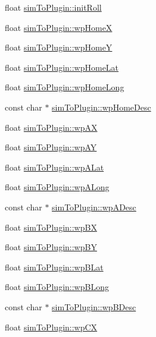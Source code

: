 \begin{DoxyCompactItemize}
\item 
float \hyperlink{group___aero_sim_r_c_ga26c1191f08e580c1cdbd02791eabe60e}{sim\-To\-Plugin\-::init\-Roll}
\item 
float \hyperlink{group___aero_sim_r_c_gac7fe47d860d72f33b075d84a1794f039}{sim\-To\-Plugin\-::wp\-Home\-X}
\item 
float \hyperlink{group___aero_sim_r_c_ga943c9583ab5e36a5c4b4eb92b34c3aa2}{sim\-To\-Plugin\-::wp\-Home\-Y}
\item 
float \hyperlink{group___aero_sim_r_c_ga5364e2cce6429762b9597145fc144130}{sim\-To\-Plugin\-::wp\-Home\-Lat}
\item 
float \hyperlink{group___aero_sim_r_c_ga1a595cb81efdafe9ec21ef40211ad74e}{sim\-To\-Plugin\-::wp\-Home\-Long}
\item 
const char $\ast$ \hyperlink{group___aero_sim_r_c_ga8662d58603fa2a33c7959677b0ec7783}{sim\-To\-Plugin\-::wp\-Home\-Desc}
\item 
float \hyperlink{group___aero_sim_r_c_gaeee88b74290e9df5d3c70d111c9375cc}{sim\-To\-Plugin\-::wp\-A\-X}
\item 
float \hyperlink{group___aero_sim_r_c_gaf5e140b64d5e9eae533fd3c0195c0fa8}{sim\-To\-Plugin\-::wp\-A\-Y}
\item 
float \hyperlink{group___aero_sim_r_c_ga1eb50174e2e2f438f0b1aef4dca0744f}{sim\-To\-Plugin\-::wp\-A\-Lat}
\item 
float \hyperlink{group___aero_sim_r_c_gacda15282e441109ecba7a4709e9b8a0c}{sim\-To\-Plugin\-::wp\-A\-Long}
\item 
const char $\ast$ \hyperlink{group___aero_sim_r_c_ga527aaa5fbbb0b3108b4ccace20e252d2}{sim\-To\-Plugin\-::wp\-A\-Desc}
\item 
float \hyperlink{group___aero_sim_r_c_gaf7735ebc4b357abc63f8b409da005e65}{sim\-To\-Plugin\-::wp\-B\-X}
\item 
float \hyperlink{group___aero_sim_r_c_ga940744eca5513d5b45725bad868231e5}{sim\-To\-Plugin\-::wp\-B\-Y}
\item 
float \hyperlink{group___aero_sim_r_c_gad362dcc92c44981f1062410b4d0105d8}{sim\-To\-Plugin\-::wp\-B\-Lat}
\item 
float \hyperlink{group___aero_sim_r_c_ga00083d7085ddb6c0cd1b432f5338d7d5}{sim\-To\-Plugin\-::wp\-B\-Long}
\item 
const char $\ast$ \hyperlink{group___aero_sim_r_c_ga847521c9c396ca010d434dde9d9c33ee}{sim\-To\-Plugin\-::wp\-B\-Desc}
\item 
float \hyperlink{group___aero_sim_r_c_ga0a8e805aa99027c87923b25db32173ab}{sim\-To\-Plugin\-::wp\-C\-X}

\end{DoxyCompactItemize}
